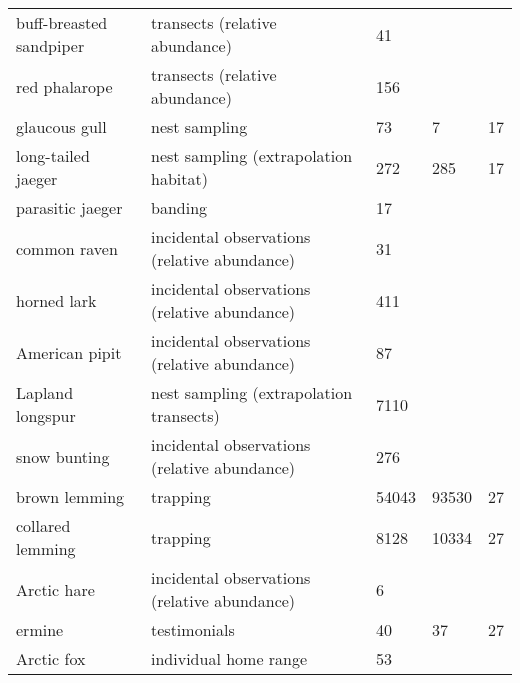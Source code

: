 \begin{table}[ht]
\begin{tabularx}{0.85\textwidth}{llllr}
  buff-breasted sandpiper & transects (relative abundance) & 41 &  &  \\ 
  red phalarope & transects (relative abundance) & 156 &  &  \\ 
  glaucous gull & nest sampling & 73 & 7 &  17 \\ 
  long-tailed jaeger & nest sampling (extrapolation habitat) & 272 & 285 &  17 \\ 
  parasitic jaeger & banding & 17 &  &  \\ 
  common raven & incidental observations (relative abundance) & 31 &  &  \\ 
  horned lark & incidental observations (relative abundance) & 411 &  &  \\ 
  American pipit & incidental observations (relative abundance) & 87 &  &  \\ 
  Lapland longspur & nest sampling (extrapolation transects) & 7110 &  &  \\ 
  snow bunting & incidental observations (relative abundance) & 276 &  &  \\ 
  brown lemming & trapping & 54043 & 93530 &  27 \\ 
  collared lemming & trapping & 8128 & 10334 &  27 \\ 
  Arctic hare & incidental observations (relative abundance) & 6 &  &  \\ 
  ermine & testimonials & 40 & 37 &  27 \\ 
  Arctic fox & individual home range & 53 &  &  \\ 
   \hline
\end{tabularx}
\endgroup
\end{table}
